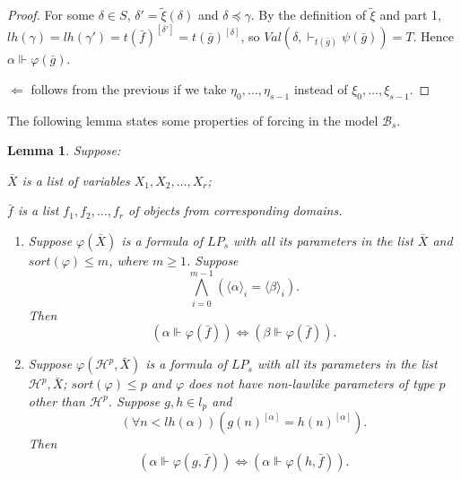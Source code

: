 \documentclass{asl}
\newtheorem{lemma}{Lemma}[section]
\theoremstyle{definition}
\begin{document}
\begin{proof}
For some $\delta \in S$, $\delta'=\tilde{\xi}(\delta)$ and $\delta\preccurlyeq\gamma$. By the definition of $ \tilde{\xi} $ and part 1,
\smallskip
\\$lh(\gamma)=lh(\gamma')=t(\bar{f})^{[\delta']}=t(\bar{g})^{[\delta]}$, so $ Val\left(\delta,\vdash_{t(\bar{g})} \psi(\bar{g}) \right)=T $. Hence $\alpha \Vdash \varphi (\bar{g}) $.
\bigskip

$ \Leftarrow $ follows from the previous if we take $ \eta_{0},\ldots,\eta_{s-1} $ instead of $ \xi_{0},\ldots,\xi_{s-1} $.
\end{proof}

The following lemma states some properties of forcing in the model $ \mathcal{B}_s $.

\begin{lemma}
Suppose:
\begin{list}{}{}
\item $ \bar{X} $ is a list of variables $ X_1,X_2,\ldots,X_r $; 
\item $ \bar{f} $ is a list $f_1, f_2,\ldots,f_r $  of objects from corresponding domains.
\end{list}

\begin{enumerate}
\item Suppose $\varphi(\bar{X}) $ is a formula of $ LP_s $ with all its parameters in the list $ \bar{X} $ and $ sort(\varphi)\leqslant m $, where $ m\geqslant 1$. Suppose 
\[ \bigwedge_{i=0}^{m-1} \left( \langle \alpha \rangle_i  = \langle \beta\rangle _i  \right).\]
Then 
\[ \left(\alpha\Vdash \varphi(\bar{f})\right)\Leftrightarrow\left(\beta\Vdash \varphi(\bar{f})\right).\]

\item Suppose $\varphi(\mathcal{H}^p,\bar{X}) $ is a formula of $ LP_s $ with all its parameters in the list $\mathcal{H}^p, \bar{X} $; $ sort(\varphi)\leqslant p $ and $ \varphi $ does not have non-lawlike parameters of type $ p $ other than $ \mathcal{H}^p $. Suppose $g,h\in l_{p}$ and 
\[(\forall n < lh(\alpha)) \left( g(n)^{[\alpha]} = h(n)^{[\alpha]}\right).  \]
Then 
\[ \left(\alpha\Vdash \varphi(g,\bar{f})\right)\Leftrightarrow\left(\alpha\Vdash \varphi(h,\bar{f})\right).\]

\end{enumerate} \label{lemma:lawless2}

\end{lemma}
\end{document}
